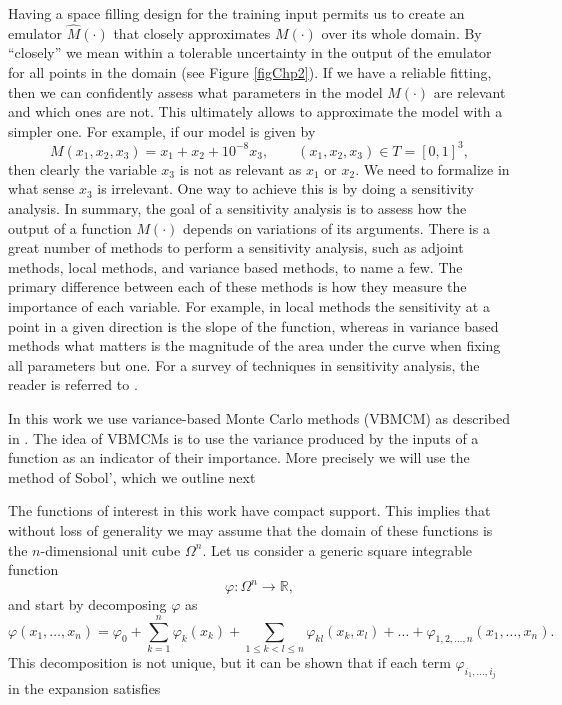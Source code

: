 \documentclass{sfuthesis}
\begin{document}
Having a space filling design for the training input permits us to create an
emulator $\widehat{M}(\cdot)$ that closely approximates $M(\cdot)$  over its whole domain. 
By ``closely'' we mean within a tolerable uncertainty in the output of the emulator 
for all points in the domain (see Figure \ref{figChp2}).
If we have a reliable fitting, then we can confidently assess what parameters in the model $M(\cdot)$
are relevant and which ones are not.
This ultimately allows to approximate  the model  with a simpler one.
For example, if our model is given by 
\begin{equation*}
M(x_{1},x_{2},x_{3})=x_{1}+x_{2}+10^{-8}x_{3},\qquad(x_{1},x_{2},x_{3})\in  T=[0,1]^{3},
\end{equation*}
then clearly the variable $x_{3}$ is not as relevant as $x_{1}$ or  $x_{2}$. We need to
formalize in what sense $x_{3}$ is irrelevant. One way to achieve this is by doing a 
sensitivity analysis. In summary, the goal of a
sensitivity analysis is to assess how
the output of a function $M(\cdot)$ depends on variations of its arguments. There is
a great number of methods to perform a sensitivity analysis, such as adjoint methods, local
methods, and variance based methods, to name a few. The primary difference between each of these
methods is how they measure the importance of each variable. For example, in local methods
the sensitivity at a point in a given direction is the slope of the function, whereas in
variance based methods what matters is the magnitude of the area under the curve when
fixing all parameters but one.
For a survey of techniques in sensitivity analysis, 
the reader is referred to \cite{saltelli2000sensitivity}. 

In this work we  use 
variance-based Monte Carlo methods (VBMCM) as described in \cite{sobol1993sensitivity}.
The idea of  VBMCMs is to use the variance produced by  the inputs of a function as an indicator of 
their importance. More precisely we will use the method of Sobol', which we outline next


The functions of interest in this work have compact support. This implies that
without loss of generality we may assume that  the domain of these functions 
is the $n$-dimensional unit cube $\Omega^{n}$. Let us consider a generic
square integrable function
\begin{equation*}
\varphi:\Omega^{n}\rightarrow\mathbb{R},
\end{equation*}
and start by decomposing $\varphi$ as 
\begin{equation*}
\varphi(x_{1},\ldots,x_{n})=\varphi_{0}+\sum_{k=1}^{n}\varphi_{k}(x_{k})+
\sum_{1\leq k< l\leq n}\varphi_{kl}(x_{k},x_{l})+\ldots+
\varphi_{1,2,\ldots,n}(x_{1},\ldots,x_{n}).
\end{equation*}
This decomposition is not unique, but it can be shown that if each term $\varphi_{i_{1},\ldots,i_{j}}$
in the expansion satisfies
\end{document}

